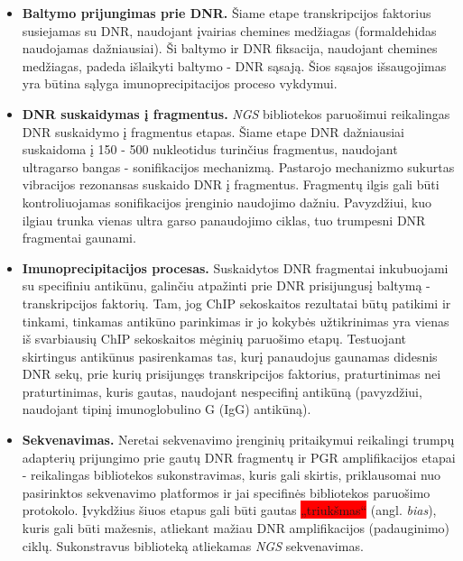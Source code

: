\documentclass[12pt]{article}
\begin{document}
\begin{itemize}
    \item \textbf{Baltymo prijungimas prie DNR.} Šiame etape transkripcijos faktorius susiejamas su DNR, naudojant įvairias chemines medžiagas (formaldehidas naudojamas dažniausiai). Ši baltymo ir DNR fiksacija,
        naudojant chemines medžiagas, padeda išlaikyti baltymo - DNR
        sąsają. Šios sąsajos išsaugojimas yra būtina sąlyga imunoprecipitacijos
        proceso vykdymui.
    \item \textbf{DNR suskaidymas į fragmentus.} \emph{NGS} bibliotekos 
        paruošimui reikalingas DNR suskaidymo į fragmentus etapas. Šiame etape
        DNR dažniausiai suskaidoma į 150 - 500 nukleotidus turinčius fragmentus,
        naudojant ultragarso bangas - sonifikacijos mechanizmą. Pastarojo
        mechanizmo sukurtas vibracijos rezonansas suskaido DNR į fragmentus.
        Fragmentų ilgis gali būti kontroliuojamas sonifikacijos įrenginio
        naudojimo dažniu. Pavyzdžiui, kuo ilgiau trunka vienas ultra garso
        panaudojimo ciklas, tuo trumpesni DNR fragmentai
        gaunami\cite{SONICATION}.
    \item \textbf{Imunoprecipitacijos procesas.} Suskaidytos DNR fragmentai
        inkubuojami su specifiniu antikūnu, galinčiu atpažinti prie DNR
        prisijungusį baltymą - transkripcijos faktorių. Tam, jog ChIP
        sekoskaitos rezultatai būtų patikimi ir tinkami, tinkamas antikūno
        parinkimas ir jo kokybės užtikrinimas yra vienas iš svarbiausių ChIP
        sekoskaitos mėginių paruošimo etapų\cite{ARTICLE3}. Testuojant
        skirtingus antikūnus pasirenkamas tas, kurį panaudojus gaunamas
        didesnis DNR sekų, prie kurių prisijungęs transkripcijos faktorius,
        praturtinimas nei praturtinimas, kuris gautas, naudojant nespecifinį
        antikūną\cite{ARTICLE4} (pavyzdžiui, naudojant tipinį imunoglobulino G
        (IgG) antikūną).
    \item \textbf{Sekvenavimas.} Neretai sekvenavimo įrenginių pritaikymui
        reikalingi trumpų adapterių prijungimo prie gautų DNR fragmentų ir PGR
        amplifikacijos etapai - reikalingas bibliotekos sukonstravimas, kuris
        gali skirtis, priklausomai nuo pasirinktos sekvenavimo platformos
        ir jai specifinės bibliotekos paruošimo protokolo\cite{ARTICLE5}.
        Įvykdžius šiuos etapus gali būti gautas \colorbox{red}{„triukšmas“}\cite{ARTICLE4}
        (angl. \emph{bias}), kuris gali būti mažesnis, atliekant mažiau DNR
        amplifikacijos (padauginimo) ciklų. Sukonstravus biblioteką atliekamas
        \emph{NGS} sekvenavimas.
\end{itemize}
\end{document}
